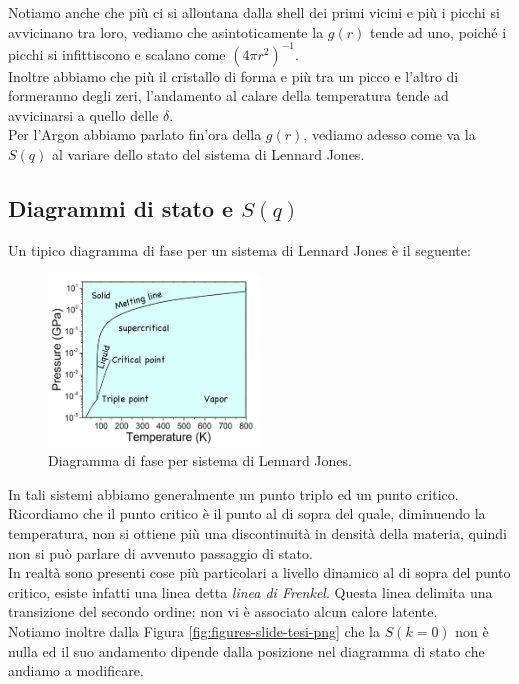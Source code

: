 Notiamo anche che più ci si allontana dalla shell dei primi vicini e più i picchi si avvicinano tra loro, vediamo che asintoticamente la $g(r)$ tende ad uno, poiché i picchi si infittiscono e scalano come $\left( 4\pi r^2 \right)^{-1}$.\\
Inoltre abbiamo che più il cristallo di forma e più tra un picco e l'altro di formeranno degli zeri, l'andamento al calare della temperatura tende ad avvicinarsi a quello delle $\delta.$ \\
Per l'Argon abbiamo parlato fin'ora della $g(r)$, vediamo adesso come va la $S(q)$ al variare dello stato del sistema di Lennard Jones.
\subsection{Diagrammi di stato e $S(q)$}
\label{subsec:Diagrammi di stato e $S(q)$}
Un tipico diagramma di fase per un sistema di Lennard Jones è il seguente:
\begin{figure}[H]
	\centering
	\includegraphics[width=0.5\textwidth]{figures/fase-lennard-jones.png}
	\caption{Diagramma di fase per sistema di Lennard Jones.}
	\label{fig:figures-fase-lennard-jones-png}
\end{figure}
\noindent
In tali sistemi abbiamo generalmente un punto triplo ed un punto critico. Ricordiamo che il punto critico è il punto al di sopra del quale, diminuendo la temperatura, non si ottiene più una discontinuità in densità della materia, quindi non si può parlare di avvenuto passaggio di stato. \\
In realtà sono presenti cose più particolari a livello dinamico al di sopra del punto critico, esiste infatti una linea detta \textit{linea di Frenkel}. Questa linea delimita una transizione del secondo ordine: non vi è associato alcun calore latente.\\
Notiamo inoltre dalla Figura \ref{fig:figures-slide-tesi-png} che la $S(k=0)$ non è nulla ed il suo andamento dipende dalla posizione nel diagramma di stato che andiamo a modificare.

